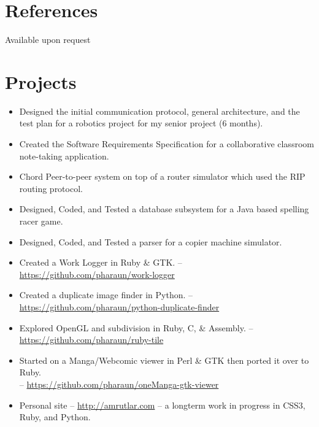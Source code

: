 \documentclass[letterpaper, paper=letter, pagesize, oneside, final]{scrartcl}
\begin{document}
\begin{center}
\section{References}

\parbox{0.945\linewidth}{Available upon request}
\section{Projects}

\vskip 2pt
\begin{itemize}[style=sameline,
                    itemsep=1pt,
                    parsep=0pt,
                    topsep=0pt,
                    partopsep=0pt,
                    labelindent=2cm,
                    rightmargin=5mm]
    \item Designed the initial communication protocol, general architecture, and the test plan for a robotics project for my senior project (6 months).
    \item Created the Software Requirements Specification for a collaborative classroom note-taking application.
    \item Chord Peer-to-peer system on top of a router simulator which used the RIP routing protocol.
    \item Designed, Coded, and Tested a database subsystem for a Java based spelling racer game.
    \item Designed, Coded, and Tested a parser for a copier machine simulator.
    \item Created a Work Logger in Ruby \& GTK. -- \url{https://github.com/pharaun/work-logger}
    \item Created a duplicate image finder in Python. -- \url{https://github.com/pharaun/python-duplicate-finder}
    \item Explored OpenGL and subdivision in Ruby, C, \& Assembly. -- \url{https://github.com/pharaun/ruby-tile}
    \item Started on a Manga/Webcomic viewer in Perl \& GTK then ported it over to Ruby. \\ -- \url{https://github.com/pharaun/oneManga-gtk-viewer}
    \item Personal site -- \url{http://amrutlar.com} -- a longterm work in progress in CSS3, Ruby, and Python.
\end{itemize}
\end{center}
\end{document}
